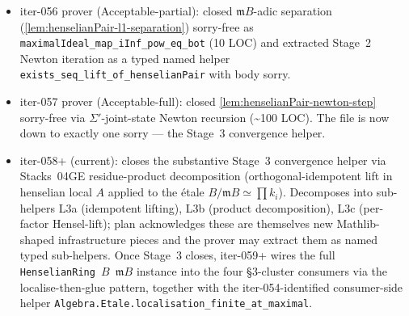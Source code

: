 \begin{itemize}
  $\mathfrak m B$-adic separation (Stage~3 prerequisite) needs
  the Noetherian descent
  $\mathrm{IsNoetherianRing}\,A + \mathrm{Module.Finite}\,A\,B
  \Rightarrow \mathrm{IsNoetherianRing}\,B$ to invoke Mathlib's
  \texttt{Ideal.iInf\_pow\_smul\_eq\_bot\_of\_le\_jacobson}.
\item iter-056 prover (Acceptable-partial): closed
  $\mathfrak m B$-adic separation
  (\cref{lem:henselianPair-l1-separation}) sorry-free as
  \texttt{maximalIdeal\_map\_iInf\_pow\_eq\_bot} (10 LOC) and
  extracted Stage~2 Newton iteration as a typed named helper
  \texttt{exists\_seq\_lift\_of\_henselianPair} with body sorry.
\item iter-057 prover (Acceptable-full): closed
  \cref{lem:henselianPair-newton-step} sorry-free via
  $\Sigma'$-joint-state Newton recursion (\textasciitilde{}100
  LOC). The file is now down to exactly one sorry — the Stage~3
  convergence helper.
\item iter-058+ (current): closes the substantive Stage~3
  convergence helper via Stacks~04GE residue-product
  decomposition (orthogonal-idempotent lift in henselian local
  $A$ applied to the étale $B/\mathfrak m B \simeq \prod k_i$).
  Decomposes into sub-helpers L3a (idempotent lifting), L3b
  (product decomposition), L3c (per-factor Hensel-lift); plan
  acknowledges these are themselves new Mathlib-shaped
  infrastructure pieces and the prover may extract them as named
  typed sub-helpers. Once Stage~3 closes, iter-059+ wires the
  full \texttt{HenselianRing $B$ $\mathfrak m B$} instance into
  the four \S3-cluster consumers via the localise-then-glue
  pattern, together with the iter-054-identified consumer-side
  helper \texttt{Algebra.Etale.localisation\_finite\_at\_maximal}.
\end{itemize}
